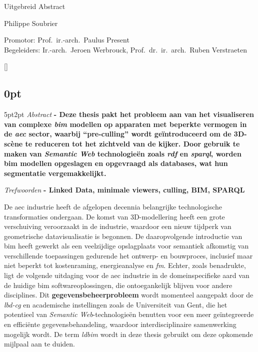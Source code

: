 \begin{center}
    \sffamily
    \huge Uitgebreid Abstract

    \Large Philippe Soubrier

    \normalsize
    Promotor: Prof.\ ir.-arch.\ Paulus Present\\
    Begeleiders: Ir.-arch.\ Jeroen Werbrouck, Prof.\ dr.\ ir.\ arch.\ Ruben Verstraeten
\end{center}
\begin{refsection}
    []{}
    \begin{multicols}{2}
        \small
        \titlespacing\subsection{0pt}{5pt}{2pt}
        \emph{Abstract} \textbf{
            - Deze thesis pakt het probleem aan van het visualiseren van complexe \emph{\ac{bim}} modellen op apparaten met beperkte vermogen in de \emph{\ac{aec}} sector, waarbij \enquote{pre-culling} wordt geïntroduceerd om de 3D-scène te reduceren tot het zichtveld van de kijker. Door gebruik te maken van \emph{Semantic Web} technologieën zoals \emph{\ac{rdf}} en \emph{\ac{sparql}}, worden \ac{bim} modellen opgeslagen en opgevraagd als databases, wat hun segmentatie vergemakkelijkt.
        }

        \emph{Trefwoorden} \textbf{
            - Linked Data, minimale viewers, culling, BIM, SPARQL
        }

        De \ac{aec} industrie heeft de afgelopen decennia belangrijke technologische transformaties ondergaan. De komst van 3D-modellering heeft een grote verschuiving veroorzaakt in de industrie, waardoor een nieuw tijdperk van geometrische datavisualisatie is begonnen. De daaropvolgende introductie van \ac{bim} heeft gewerkt als een veelzijdige opslagplaats voor semantiek afkomstig van verschillende toepassingen gedurende het ontwerp- en bouwproces, inclusief maar niet beperkt tot kostenraming, energieanalyse en \emph{\ac{fm}}. Echter, zoals \cite{Werbrouck2018} benadrukte, ligt de volgende uitdaging voor de \ac{aec} industrie in de domeinspecifieke aard van de huidige \ac{bim} softwareoplossingen, die ontoegankelijk blijven voor andere disciplines. Dit \textbf{gegevensbeheerprobleem} wordt momenteel aangepakt door de \emph{\ac{lbd-cg}} en academische instellingen zoals de Universiteit van Gent, die het potentieel van \emph{Semantic Web}-technologieën benutten voor een meer geïntegreerde en efficiënte gegevensbehandeling, waardoor interdisciplinaire samenwerking mogelijk wordt. De term \emph{\ac{ldbim}} wordt in deze thesis gebruikt om deze opkomende mijlpaal aan te duiden.


\end{multicols}
\end{refsection}
